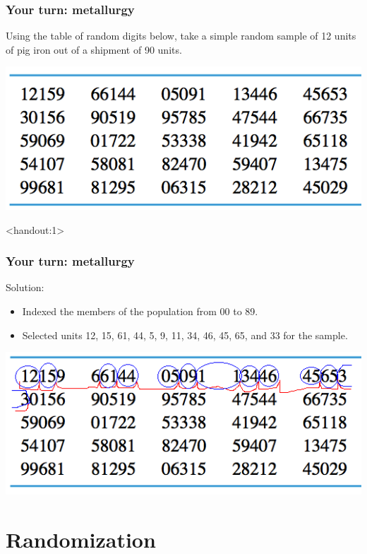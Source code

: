 \documentclass[handout]{beamer}
\newcommand{\answers}{1}
\numberwithin{equation}{section}
\begin{document}
\begin{frame}
\frametitle{Your turn: metallurgy}

Using the table of random digits below, take a simple random sample of 12 units of pig iron out of a shipment of 90 units.

\begin{center}
 \includegraphics{../../fig/rdigitsshort.png}
\end{center}

\end{frame}


\begin{frame}<handout:\answers>
\frametitle{Your turn: metallurgy}

Solution:
\begin{itemize}
\item Indexed the members of the population from 00 to 89.
\pause \item Selected units 12, 15, 61, 44, 5, 9, 11, 34, 46, 45, 65, and 33 for the sample.
\end{itemize}

\begin{center}
 \includegraphics{../../fig/rdigitsshortmarked.png}
\end{center}

\end{frame}



\section{Randomization}
\end{document}
